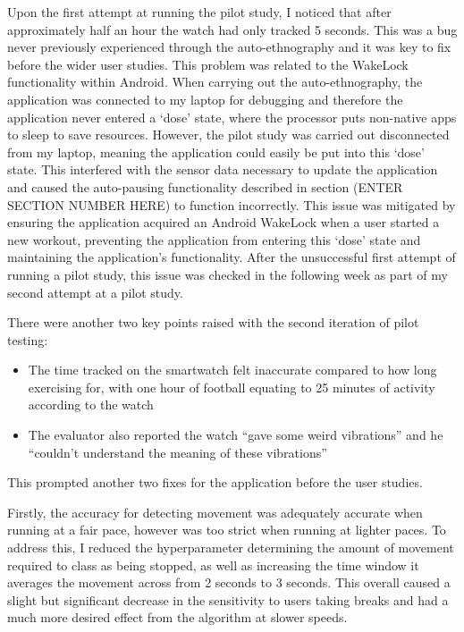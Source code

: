 \documentclass{l4proj}
\begin{document}
Upon the first attempt at running the pilot study, I noticed that after approximately half an hour the watch had only tracked 5 seconds. This was a bug never previously experienced through the auto-ethnography and it was key to fix before the wider user studies. This problem was related to the WakeLock functionality within Android. When carrying out the auto-ethnography, the application was connected to my laptop for debugging and therefore the application never entered a ‘dose’ state, where the processor puts non-native apps to sleep to save resources. However, the pilot study was carried out disconnected from my laptop, meaning the application could easily be put into this ‘dose’ state. This interfered with the sensor data necessary to update the application and caused the auto-pausing functionality described in section (ENTER SECTION NUMBER HERE) to function incorrectly. This issue was mitigated by ensuring the application acquired an Android WakeLock when a user started a new workout, preventing the application from entering this ‘dose’ state and maintaining the application’s functionality. After the unsuccessful first attempt of running a pilot study, this issue was checked in the following week as part of my second attempt at a pilot study.

There were another two key points raised with the second iteration of pilot testing:

\begin{itemize}
    \item The time tracked on the smartwatch felt inaccurate compared to how long exercising for, with one hour of football equating to 25 minutes of activity according to the watch
    \item The evaluator also reported the watch “gave some weird vibrations” and he “couldn’t understand the meaning of these vibrations”
\end{itemize}

This prompted another two fixes for the application before the user studies. 

Firstly, the accuracy for detecting movement was adequately accurate when running at a fair pace, however was too strict when running at lighter paces. To address this, I reduced the hyperparameter determining the amount of movement required to class as being stopped, as well as increasing the time window it averages the movement across from 2 seconds to 3 seconds. This overall caused a slight but significant decrease in the sensitivity to users taking breaks and had a much more desired effect from the algorithm at slower speeds.
\end{document}
